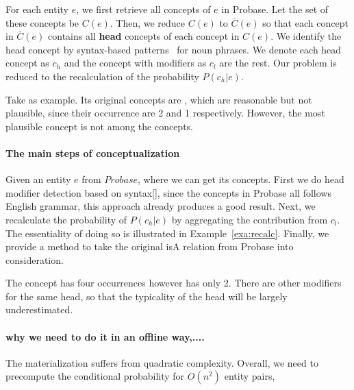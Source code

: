 For each entity $e$, we first retrieve all concepts of $e$ in Probase.
Let the set of these concepts be $C(e)$.
Then, we reduce $C(e)$ to $\bar{C}(e)$ so that each concept in $\bar{C}(e)$ contains all {\bf head} concepts of each concept in $C(e)$.
We identify the head concept by syntax-based patterns~\cite{ponzetto2007deriving} for noun phrases.
We denote each head concept as $c_h$ and the concept with modifiers as $c_{l}$ are the rest.
Our problem is reduced to the recalculation of the probability $P({c_h}|e)$.

\begin{example}
\label{exa:HvsO}
Take  as example. Its original concepts are , which are reasonable but not plausible, since their occurrence are 2 and 1 respectively. However, the most plausible concept  is not among the concepts.
\end{example}


\paragraph{The main steps of conceptualization}
Given an entity $e$ from $Probase$, where we can get its concepts.
First we do head modifier detection based on syntax[], since the concepts in Probase all follows English grammar, this approach already produces a good result.
Next, we recalculate the probability of $P({c_h}|e)$ by aggregating the contribution from $c_l$.
The essentiality of doing so is illustrated in Example~\ref{exa:recalc}.
Finally, we provide a method to take the original isA relation from Probase into consideration.

\begin{example}
\label{exa:recalc}
 The concept  has four occurrences however  has only 2. There are other modifiers for the same head, so that the typicality of the head will be largely underestimated.
\end{example}

\paragraph*{why we need to do it in an offline way,....}
The materialization suffers from quadratic complexity. Overall, we need to precompute the conditional probability for $O(n^2)$ entity pairs,  


